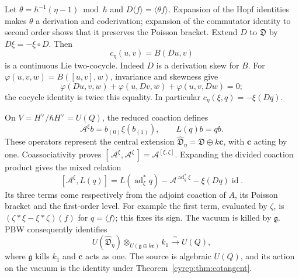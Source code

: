 Let
\(\theta=\hbar^{-1}(\eta-1)\bmod\hbar\) and
\(D\langle f\rangle=\langle\theta f\rangle\).
Expansion of the Hopf identities makes \(\theta\) a derivation
and coderivation; expansion of the commutator identity to second
order shows that it preserves the Poisson bracket.
Extend \(D\) to \(\mathfrak D\) by \(D\xi=-\xi\circ D\).
Then
\begin{equation}\label{cyrep:eq:double-cocycle}
 c_\eta(u,v)=B(Du,v)
\end{equation}
is a continuous Lie two-cocycle.
Indeed \(D\) is a derivation skew for \(B\).
For \(\varphi(u,v,w)=B([u,v],w)\), invariance and skewness give
\[
 \varphi(Du,v,w)+\varphi(u,Dv,w)+\varphi(u,v,Dw)=0;
\]
the cocycle identity is twice this equality.
In particular \(c_\eta(\xi,q)=-\xi(Dq)\).

On \(V=H^\vee/\hbar H^\vee=U(Q)\), the reduced coaction
defines
\[
 \mathcal A^\xi b=b_{(0)}\xi(b_{(1)}),\qquad L(q)b=qb.
\]
These operators represent the central extension
\(\widehat{\mathfrak D}_\eta=\mathfrak D\oplus k\mathbf c\),
with \(\mathbf c\) acting by one.
Coassociativity proves
\([\,\mathcal A^\xi,\mathcal A^\zeta\,]=\mathcal A^{[\xi,\zeta]}\).
Expanding the divided coaction product gives the mixed relation
\begin{equation}\label{cyrep:eq:double-action}
 [\mathcal A^\xi,L(q)]
 =L(\operatorname{ad}^*_\xi q)
       -\mathcal A^{\operatorname{ad}^*_q\xi}
       -\xi(Dq)\operatorname{id}.
\end{equation}
Its three terms come respectively from the adjoint coaction of
\(A\), its Poisson bracket and the first-order level.
For example the first term, evaluated by \(\zeta\), is
\((\zeta*\xi-\xi*\zeta)(f)\) for \(q=\langle f\rangle\);
this fixes its sign.
The vacuum is killed by \(\mathfrak g\).
PBW consequently identifies
\begin{equation}\label{cyrep:eq:induced-vacuum}
 U(\widehat{\mathfrak D}_\eta)
       \otimes_{U(\mathfrak g\oplus k\mathbf c)}k_1
          \xrightarrow{\ \sim\ }U(Q),
\end{equation}
where \(\mathfrak g\) kills \(k_1\) and \(\mathbf c\) acts as one.
The source is algebraic \(U(Q)\), and its action on the vacuum
is the identity under Theorem~\ref{cyrep:thm:cotangent}.

